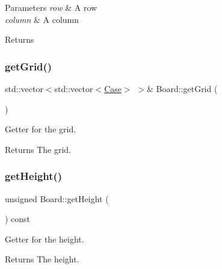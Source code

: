 \begin{DoxyParams}{Parameters}
{\em row} & A row \\
\hline
{\em column} & A column \\
\hline
\end{DoxyParams}
\begin{DoxyReturn}{Returns}

\end{DoxyReturn}
\mbox{\label{class_board_a15ae2a1e56e7a0c97a239a5311a1eb53}} 
\subsubsection{\texorpdfstring{get\+Grid()}{getGrid()}}
{\footnotesize\ttfamily std\+::vector$<$std\+::vector$<$\hyperlink{class_case}{Case}$>$ $>$\& Board\+::get\+Grid (\begin{DoxyParamCaption}{ }\end{DoxyParamCaption})\hspace{0.3cm}{\ttfamily [inline]}}



Getter for the grid. 

\begin{DoxyReturn}{Returns}
The grid. 
\end{DoxyReturn}
\mbox{\label{class_board_abbc7d5be210011b7c37315512a8a2cdb}} 
\subsubsection{\texorpdfstring{get\+Height()}{getHeight()}}
{\footnotesize\ttfamily unsigned Board\+::get\+Height (\begin{DoxyParamCaption}{ }\end{DoxyParamCaption}) const\hspace{0.3cm}{\ttfamily [inline]}}



Getter for the height. 

\begin{DoxyReturn}{Returns}
The height. 
\end{DoxyReturn}
\mbox{\label{class_board_aaee53d499b43971e1ef5b6fa0d65aca3}} 
